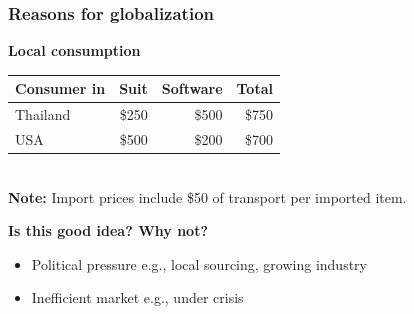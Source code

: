\documentclass[10pt,handout]{beamer}
\begin{document}
\begin{frame}[label=trade]
  \frametitle{Reasons for globalization \forIE}

  \begin{center} \footnotesize{
  \textbf{Local consumption}\\
  \begin{tabular}{lrrr} \hline
    Consumer in   & Suit   &  Software    & Total \\ \hline
    Thailand      & \$250  &  \$500       & \$750 \\
    USA           & \$500  &  \$200       & \$700 \\ \hline
  \end{tabular}

   \\
  \textbf{Note:} Import prices include \$50 of transport per imported item. \hfill
  }
  \end{center}


  \NextLine
  \textbf{Is this good idea? Why not?}
  \begin{itemize}
    \item<3-> Political pressure e.g., local sourcing, growing industry
    \item<3-> Inefficient market e.g., under crisis
  \end{itemize}

  \hfill \hyperlink{why_care}{}


\end{frame}
\end{document}
